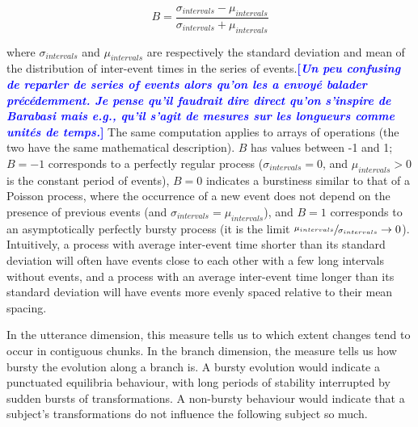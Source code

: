 \documentclass[a4paper,fleqn]{cas-dc}
\newcommand{\tb}[1]{\textcolor{blue}{#1}}
\newcommand{\rk}[1]{\tb{{\footnotesize {\bf[\emph{#1}]}}}}
\begin{document}
\[B = \frac{\sigma_{intervals} - \mu_{intervals}}{\sigma_{intervals} + \mu_{intervals}}\]

where \(\sigma_{intervals}\) and \(\mu_{intervals}\) are respectively
the standard deviation and mean of the distribution of inter-event times
in the series of events.\rk{Un peu confusing de reparler de series of events alors qu'on les a envoyé balader précédemment.  Je pense qu'il faudrait dire direct qu'on s'inspire de Barabasi mais e.g., qu'il s'agit de mesures sur les longueurs comme unités de temps.} The same computation applies to arrays of
operations (the two have the same mathematical description). \(B\) has
values between -1 and 1; \(B = -1\) corresponds to a perfectly regular
process (\(\sigma_{intervals} = 0\), and \(\mu_{intervals} > 0\) is the
constant period of events), \(B = 0\) indicates a burstiness similar to
that of a Poisson process, where the occurrence of a new event does not
depend on the presence of previous events (and
\(\sigma_{intervals} = \mu_{intervals}\)), and \(B = 1\) corresponds to
an asymptotically perfectly bursty process (it is the limit
\(\sfrac{\mu_{intervals}}{\sigma_{intervals}} \rightarrow 0\)).
Intuitively, a process with average inter-event time shorter than its
standard deviation will often have events close to each other with a few
long intervals without events, and a process with an average inter-event
time longer than its standard deviation will have events more evenly
spaced relative to their mean spacing.

In the utterance dimension, this measure tells us to which extent changes
tend to occur in contiguous chunks.
In the branch dimension, the measure tells us how bursty the evolution along a
branch is. A bursty evolution would indicate a punctuated equilibria
behaviour, with long periods of stability interrupted by sudden bursts
of transformations. A non-bursty behaviour would indicate that a
subject's transformations do not influence the following subject so
much.
\end{document}
